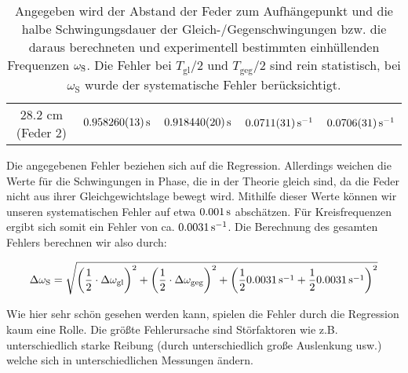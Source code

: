\begin{table}
{\begin{tabular}{ccccc}
    \hline
    28.2 cm (Feder 2)  & $\unit[0.958260(13)]{s}$  & $\unit[0.918440(20)]{s}$  & $\unit[0.0711(31)]{s^{-1}}$  & $\unit[0.0706(31)]{s^{-1}}$\\
\end{tabular}
}
\caption{Angegeben wird der Abstand der Feder zum Aufhängepunkt und die halbe Schwingungsdauer der Gleich-/Gegenschwingungen bzw. die daraus berechneten und experimentell bestimmten einhüllenden Frequenzen $\omega_{\mathrm{S}}$. Die Fehler bei $T_\mathrm{gl}/2$ und $T_\mathrm{geg}/2$ sind rein statistisch, bei $\omega_\mathrm{S}$ wurde der systematische Fehler berücksichtigt.}
\label{tb:values}
\end{table}

Die angegebenen Fehler beziehen sich auf die Regression. Allerdings weichen die Werte für die Schwingungen in Phase, die in der Theorie gleich sind, da die Feder nicht aus ihrer Gleichgewichtslage bewegt wird. Mithilfe dieser Werte können wir unseren systematischen Fehler auf etwa $\unit[0.001]{s}$ abschätzen. Für Kreisfrequenzen ergibt sich somit ein Fehler von ca. $\unit[0.0031]{s^{-1}}$. Die Berechnung des gesamten Fehlers berechnen wir also durch:

\begin{equation*}
\Delta \omega_\n{S} = \sqrt{
\left(\frac{1}{2} \cdot \Delta\omega_\n{gl}\right)^2
+ 
\left(\frac{1}{2} \cdot \Delta\omega_\n{geg}\right)^2
+
\left(\frac12 \unit[0.0031]{s^{-1}} + \frac12 \unit[0.0031]{s^{-1}} \right)^2
}
\end{equation*}

Wie hier sehr schön gesehen werden kann, spielen die Fehler durch die Regression kaum eine Rolle. Die größte Fehlerursache sind Störfaktoren wie z.B. unterschiedlich starke Reibung (durch unterschiedlich große Auslenkung usw.) welche sich in unterschiedlichen Messungen ändern.




